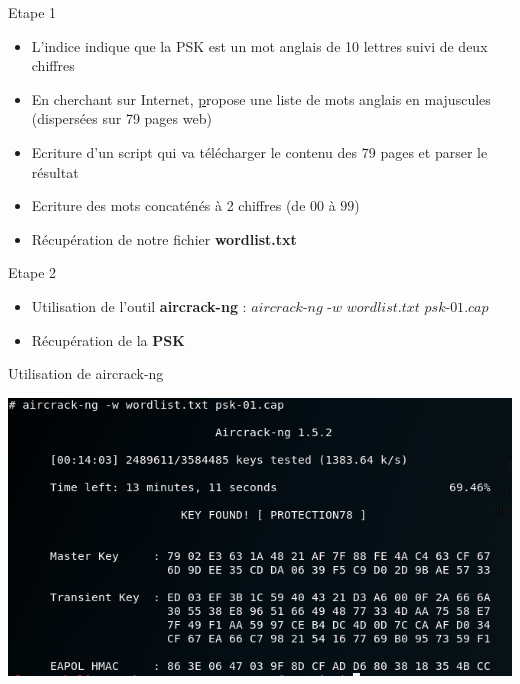 \documentclass{beamer}
\begin{document}
	\begin{frame}
	\begin{block}{Etape 1}
		\begin{itemize}
			\item L'indice indique que la PSK est un mot anglais de 10 lettres suivi de deux chiffres
			\item En cherchant sur Internet, \href{www.bestwordlist.com/10letterwords.htm} propose une liste de mots anglais en majuscules (dispersées sur 79 pages web)
			\item Ecriture d'un script qui va télécharger le contenu des 79 pages et parser le résultat
			\item Ecriture des mots concaténés à 2 chiffres (de $00$ à $99$)
			\item Récupération de notre fichier \textbf{wordlist.txt}
		\end{itemize}
	\end{block}
	\end{frame}

	\begin{frame}
	\begin{block}{Etape 2}
		\begin{itemize}
			\item Utilisation de l'outil \textbf{aircrack-ng} : \newline $aircrack$-$ng$ -$w$ $wordlist.txt$ $psk$-$01$.$cap$
			\item Récupération de la \textbf{PSK}
		\end{itemize}
	\end{block}
	\begin{exampleblock}{Utilisation de aircrack-ng}
		\begin{center}
				\includegraphics[scale=0.4]{./pictures/118-wpa-forensics-aircrackng.PNG}
		\end{center}
	\end{exampleblock}
	\end{frame}
\end{document}
